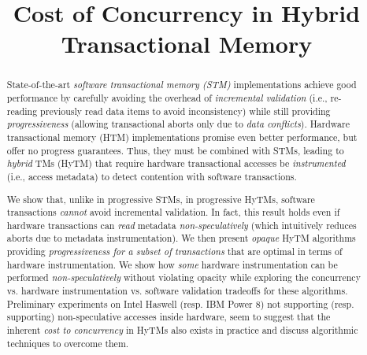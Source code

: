 \documentclass[nocopyrightspace,numbers,10pt,preprint]{sigplanconf}
\begin{document}
\title{Cost of Concurrency in Hybrid Transactional Memory}
\authorinfo{}{}

\maketitle

\newcommand{\trevor}[1]{\textbf{[[#1--Trevor]]}}

%
\begin{abstract}
State-of-the-art \emph{software transactional memory (STM)} implementations achieve 
good performance by carefully avoiding the overhead of \emph{incremental validation} (i.e., re-reading previously read data items to avoid inconsistency) while
still providing \emph{progressiveness} (allowing transactional aborts only due to \emph{data conflicts}).
Hardware transactional memory (HTM) implementations promise even better performance, but offer no progress guarantees.
Thus, they must be combined with STMs, leading to \emph{hybrid} TMs (HyTM)
that require hardware transactional accesses be \emph{instrumented} (i.e., access metadata) to detect contention with software transactions. 

We show that, unlike in progressive STMs, in progressive HyTMs, software transactions \textit{cannot} avoid incremental validation.
In fact, this result holds even if hardware transactions can \emph{read} metadata \emph{non-speculatively} (which intuitively reduces aborts due to metadata instrumentation).
%
We then present \emph{opaque} HyTM algorithms providing \emph{progressiveness for a subset of transactions} that are  %
optimal in terms of hardware instrumentation. We show 
how \emph{some} hardware instrumentation can be performed \textit{non-speculatively} without violating opacity while exploring the concurrency vs. hardware instrumentation vs. software validation
tradeoffs for these algorithms.
Preliminary experiments on Intel Haswell (resp. IBM Power 8) not supporting (resp. supporting) non-speculative accesses inside hardware,
seem to suggest that the inherent \emph{cost to concurrency} in HyTMs also exists in practice and discuss algorithmic techniques to overcome them.
\end{abstract}

{}\setcounter{page}{1}


%

%

%

%

%

%

%
\newpage
%


\end{document}
